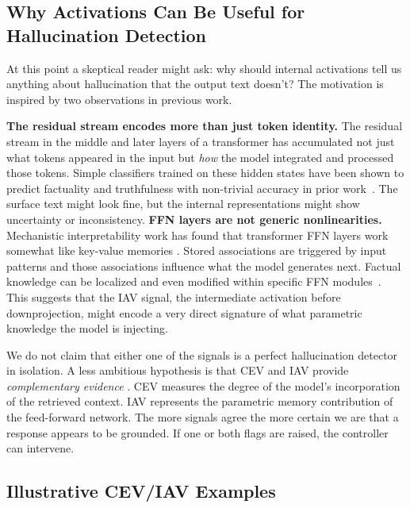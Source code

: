 \subsection{Why Activations Can Be Useful for Hallucination Detection}
\label{sec:why_activations}

At this point a skeptical reader might ask: why should internal activations tell us anything about hallucination that the output text doesn't? The motivation is inspired by two observations in previous work.

\textbf{The residual stream encodes more than just token identity.} The residual stream in the middle and later layers of a transformer has accumulated not just what tokens appeared in the input but \emph{how} the model integrated and processed those tokens. Simple classifiers trained on these hidden states have been shown to predict factuality and truthfulness with non-trivial accuracy in prior work~\cite{azaria2023saplma}. The surface text might look fine, but the internal representations might show uncertainty or inconsistency. \textbf{FFN layers are not generic nonlinearities.} Mechanistic interpretability work has found that transformer FFN layers work somewhat like key-value memories \cite{geva2021ffn}. Stored associations are triggered by input patterns and those associations influence what the model generates next. Factual knowledge can be localized and even modified within specific FFN modules~\cite{meng2022locating}. This suggests that the IAV signal, the intermediate activation before downprojection, might encode a very direct signature of what parametric knowledge the model is injecting.

We do not claim that either one of the signals is a perfect hallucination detector in isolation. A less ambitious hypothesis is that CEV and IAV provide \emph{complementary evidence} . CEV measures the degree of the model's incorporation of the retrieved context. IAV represents the parametric memory contribution of the feed-forward network. The more signals agree the more certain we are that a response appears to be grounded. If one or both flags are raised, the controller can intervene.



\subsection{Illustrative CEV/IAV Examples}
\label{sec:illustrative_examples}

